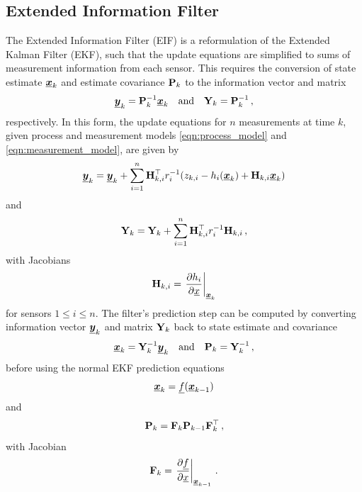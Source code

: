 \documentclass[twocolumn]{autart}
\begin{document}
\subsection{Extended Information Filter}
The Extended Information Filter (EIF) \cite{maybeckStochasticModelsEstimation1982} is a reformulation of the Extended Kalman Filter (EKF), such that the update equations are simplified to sums of measurement information from each sensor. This requires the conversion of state estimate ${\boldsymbol{\underline{x}}}_k$ and estimate covariance ${{\mathbf{P}}}_k$ to the information vector and matrix
\begin{equation}
    {\boldsymbol{\underline{y}}}_k = {{\mathbf{P}}}_k^{-1}{\boldsymbol{\underline{x}}}_k \quad\textrm{and}\quad {\ensuremath{{\mathbf{Y}}}}_k = {{\mathbf{P}}}_k^{-1}\,,
\end{equation}
respectively. In this form, the update equations for $n$ measurements at time $k$, given process and measurement models \eqref{eqn:process_model} and \eqref{eqn:measurement_model}, are given by
\begin{equation}
    {\boldsymbol{\underline{y}}}_k = {\boldsymbol{\underline{y}}}_{k} + \sum^n_{i=1}{{\mathbf{H}}}^\top_{k,i} r^{-1}_i (z_{k,i} - h_i({\boldsymbol{\underline{x}}}_k) + {{\mathbf{H}}}_{k,i}{\boldsymbol{\underline{x}}}_k) \label{eqn:eif_info_vec_update}
\end{equation}
and
\begin{equation}
    {\ensuremath{{\mathbf{Y}}}}_k = {{\mathbf{Y}}}_{k} + \sum^n_{i=1}{{\mathbf{H}}}^\top_{k,i} r^{-1}_i {{\mathbf{H}}}_{k,i}\,, \label{eqn:eif_info_mat_update}
\end{equation}
with Jacobians
\begin{equation}
    {\ensuremath{{\mathbf{H}}}}_{k,i} = \left.\frac{\partial h_i}{\partial {\underline{x}}}\right|_{{\boldsymbol{\underline{x}}}_k} \label{eqn:measurement_jacobian}
\end{equation}
for sensors $1 \leq i \leq n$. The filter's prediction step can be computed by converting information vector ${\boldsymbol{\underline{y}}}_k$ and matrix ${{\mathbf{Y}}}_k$ back to state estimate and covariance 
\begin{equation}
    {\boldsymbol{\underline{x}}}_k = {{\mathbf{Y}}}_k^{-1}{\boldsymbol{\underline{y}}}_k \quad\textrm{and}\quad {\ensuremath{{\mathbf{P}}}}_k = {{\mathbf{Y}}}_k^{-1}\,,
\end{equation}
before using the normal EKF prediction equations
\begin{equation}
    {\boldsymbol{\underline{x}}}_k = {\underline{f}}({\boldsymbol{\underline{x}}}_{k-1})
\end{equation}
and
\begin{equation}
    {\ensuremath{{\mathbf{P}}}}_k = {{\mathbf{F}}}_k{{\mathbf{P}}}_{k-1}{{\mathbf{F}}}_k^\top\,,
\end{equation}
with Jacobian
\begin{equation}
    {\ensuremath{{\mathbf{F}}}}_{k} = \left.\frac{\partial {\underline{f}}}{\partial {\underline{x}}}\right|_{{\boldsymbol{\underline{x}}}_{k-1}}\,. \label{eqn:jacobian_f}
\end{equation}
\end{document}
